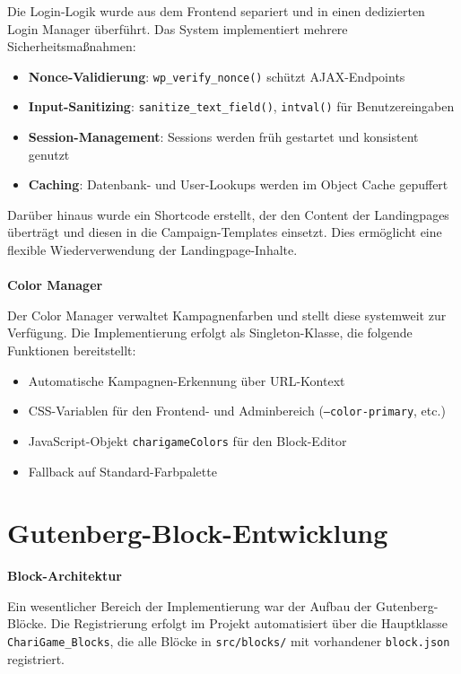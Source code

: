 Die Login-Logik wurde aus dem Frontend separiert und in einen dedizierten Login Manager überführt.
Das System implementiert mehrere Sicherheitsmaßnahmen:

\begin{itemize}
    \item \textbf{Nonce-Validierung}: \texttt{wp\_verify\_nonce()} schützt AJAX-Endpoints
    \item \textbf{Input-Sanitizing}: \texttt{sanitize\_text\_field()}, \texttt{intval()} für Benutzereingaben
    \item \textbf{Session-Management}: Sessions werden früh gestartet und konsistent genutzt
    \item \textbf{Caching}: Datenbank- und User-Lookups werden im Object Cache gepuffert
\end{itemize}

Darüber hinaus wurde ein Shortcode erstellt, der den Content der Landingpages überträgt und diesen in die Campaign-Templates einsetzt.
Dies ermöglicht eine flexible Wiederverwendung der Landingpage-Inhalte.
\\\\
\textbf{Color Manager}

Der Color Manager verwaltet Kampagnenfarben und stellt diese systemweit zur Verfügung.
Die Implementierung erfolgt als Singleton-Klasse, die folgende Funktionen bereitstellt:

\begin{itemize}
    \item Automatische Kampagnen-Erkennung über URL-Kontext
    \item CSS-Variablen für den Frontend- und Adminbereich (\texttt{--color-primary}, etc.)
    \item JavaScript-Objekt \texttt{charigameColors} für den Block-Editor
    \item Fallback auf Standard-Farbpalette
\end{itemize}

\section{Gutenberg-Block-Entwicklung}
\textbf{Block-Architektur}

Ein wesentlicher Bereich der Implementierung war der Aufbau der Gutenberg-Blöcke.
Die Registrierung erfolgt im Projekt automatisiert über die Hauptklasse \texttt{ChariGame\_Blocks}, die alle Blöcke in \texttt{src/blocks/} mit vorhandener \texttt{block.json} registriert.

